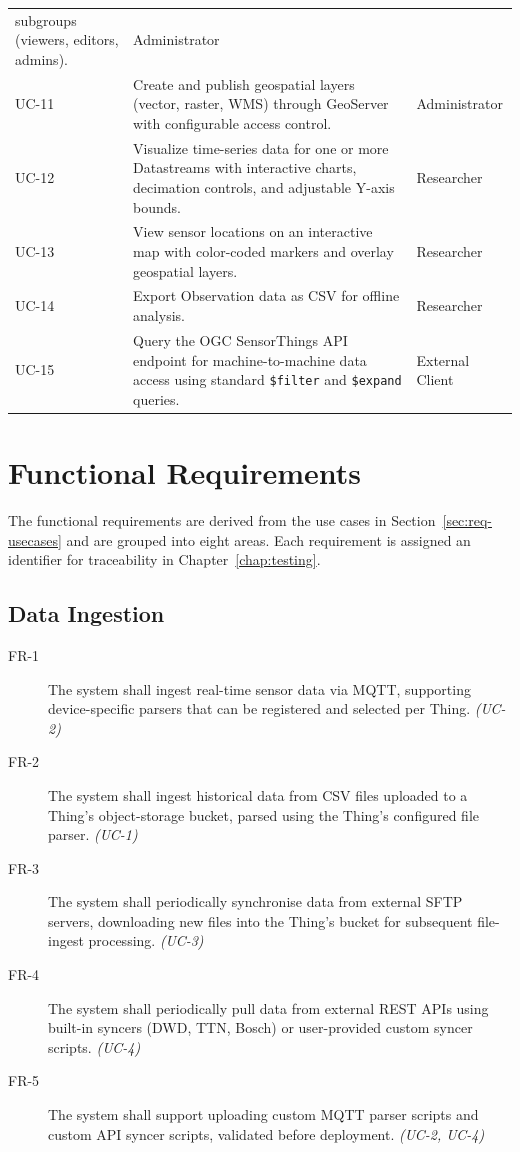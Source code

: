 \begin{longtable}{l p{} l}
          subgroups (viewers, editors, admins). & Administrator \\
  UC-11 & Create and publish geospatial layers (vector, raster, WMS) through
          GeoServer with configurable access control. & Administrator \\
  UC-12 & Visualize time-series data for one or more Datastreams with
          interactive charts, decimation controls, and adjustable Y-axis bounds.
          & Researcher \\
  UC-13 & View sensor locations on an interactive map with color-coded markers
          and overlay geospatial layers. & Researcher \\
  UC-14 & Export Observation data as CSV for offline analysis. & Researcher \\
  UC-15 & Query the OGC SensorThings API endpoint for machine-to-machine data
          access using standard \texttt{\$filter} and \texttt{\$expand} queries. & External Client \\
\end{longtable}

\section{Functional Requirements}
\label{sec:req-functional}

The functional requirements are derived from the use cases in Section~\ref{sec:req-usecases}
and are grouped into eight areas. Each requirement is assigned an identifier for traceability
in Chapter~\ref{chap:testing}.

\subsection{Data Ingestion}
\label{sec:req-functional-ingestion}

\begin{description}
  \item[FR-1] The system shall ingest real-time sensor data via MQTT, supporting device-specific
    parsers that can be registered and selected per Thing. \emph{(UC-2)}
  \item[FR-2] The system shall ingest historical data from CSV files uploaded to a Thing's
    object-storage bucket, parsed using the Thing's configured file parser. \emph{(UC-1)}
  \item[FR-3] The system shall periodically synchronise data from external SFTP servers,
    downloading new files into the Thing's bucket for subsequent file-ingest processing.
    \emph{(UC-3)}
  \item[FR-4] The system shall periodically pull data from external REST APIs using built-in
    syncers (DWD, TTN, Bosch) or user-provided custom syncer scripts. \emph{(UC-4)}
  \item[FR-5] The system shall support uploading custom MQTT parser scripts and custom API
    syncer scripts, validated before deployment. \emph{(UC-2, UC-4)}
\end{description}

